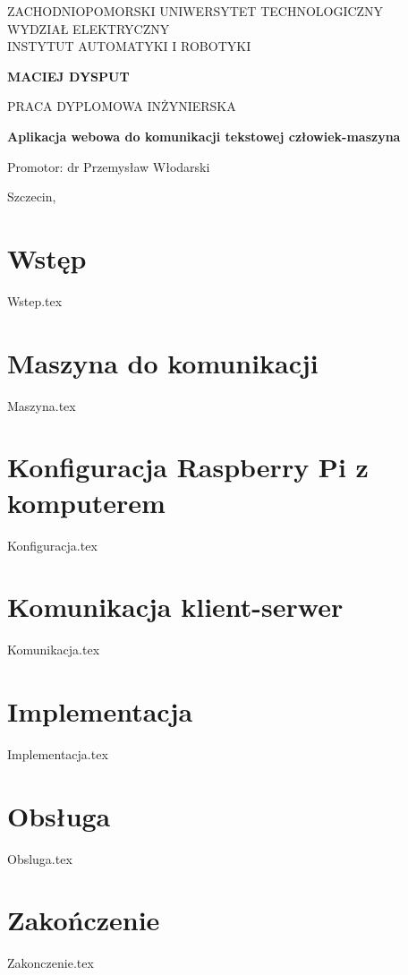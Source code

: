 \documentclass[12pt,a4paper,leqno,oneside,titlepage]{mwrep}
\begin{document}
\begin{titlepage}
\begin{center}

{\large ZACHODNIOPOMORSKI UNIWERSYTET TECHNOLOGICZNY\\ WYDZIAŁ ELEKTRYCZNY\\ INSTYTUT AUTOMATYKI I ROBOTYKI\par}
\end{center}
\vspace{1.5cm plus 1fill}
\begin{center}
{\bf \Large MACIEJ DYSPUT\par}
\end{center}
\vspace{1.5cm plus 1mm minus 2mm}
\begin{center}
{\large PRACA DYPLOMOWA INŻYNIERSKA\par}
\end{center}
\vspace{1.5cm plus 1mm minus 2mm}
\begin{center}
{\huge\textbf{Aplikacja webowa do komunikacji tekstowej człowiek-maszyna}\par}
\vspace{1.5cm plus 1.5fill}
\begin{flushright}
{\large Promotor: dr Przemysław Włodarski}
\end{flushright}
\vspace{4cm plus .1fill}
{\large Szczecin,\par}
\end{center}
\end{titlepage}
\tableofcontents
\chapter{Wstęp}
{Wstep.tex}

\chapter{Maszyna do komunikacji}
{Maszyna.tex}

\chapter{Konfiguracja Raspberry Pi z komputerem}
{Konfiguracja.tex}

\chapter{Komunikacja klient-serwer}
{Komunikacja.tex}

\chapter{Implementacja}
{Implementacja.tex}

\chapter{Obsługa}
{Obsluga.tex}

\chapter{Zakończenie}
{Zakonczenie.tex}
\end{document}
